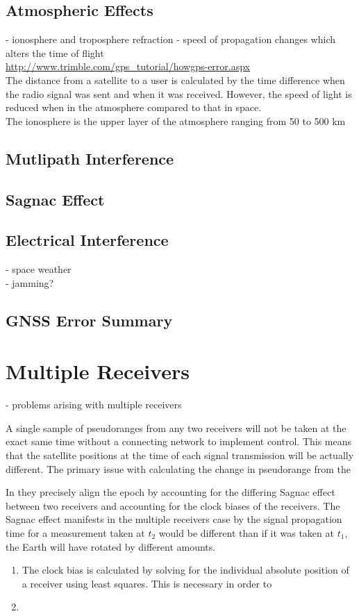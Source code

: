 \subsection{Atmospheric Effects}
- ionosphere and troposphere refraction - speed of propagation changes which alters the time of flight\\
\url{http://www.trimble.com/gps_tutorial/howgps-error.aspx} \\
The distance from a satellite to a user is calculated by the time difference when the radio signal was sent and when it was received. However, the speed of light is reduced when in the atmosphere compared to that in space.\\
The ionosphere is the upper layer of the atmosphere ranging from 50 to 500 km


\subsection{Mutlipath Interference}


\subsection{Sagnac Effect}


\subsection{Electrical Interference}
- space weather\\
- jamming?

\subsection{GNSS Error Summary}


\section{Multiple Receivers}
- problems arising with multiple receivers

A single sample of pseudoranges from any two receivers will not be taken at the exact same time without a connecting network to implement control. This means that the satellite positions at the time of each signal transmission will be actually different. The primary issue with calculating the change in pseudorange from the 

In \cite{HighAccDiffTrack} they precisely align the epoch by accounting for the differing Sagnac effect between two receivers and accounting for the clock biases of the receivers. The Sagnac effect manifests in the multiple receivers case by the signal propagation time for a measurement taken at $t_2$ would be different than if it was taken at $t_1$, the Earth will have rotated by different amounts. 
\begin{enumerate}
\item The clock bias is calculated by solving for the individual absolute position of a receiver using least squares. This is necessary in order to 
\item  
\end{enumerate}






